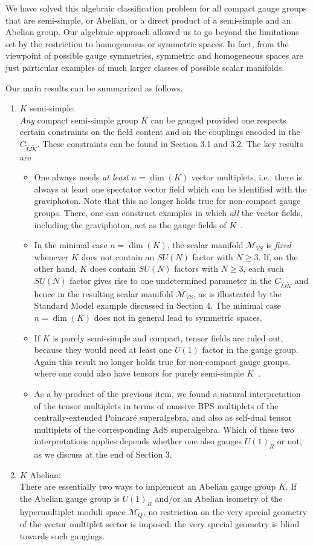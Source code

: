 \documentclass[a4paper,11pt]{article}
\newcommand{\ti}{\ensuremath{\tilde{I}}}
\newcommand{\tj}{\ensuremath{\tilde{J}}}
\newcommand{\tk}{\ensuremath{\tilde{K}}}
\newcommand{\M}{\ensuremath{\mathcal{M}}}
\begin{document}
We have solved this algebraic classification problem for all compact gauge
groups that are semi-simple, or Abelian, or a direct product of a
semi-simple and an Abelian group. Our algebraic approach allowed us to go
beyond the limitations set by the restriction to homogeneous or symmetric
spaces. In fact, from the viewpoint of possible gauge symmetries,
symmetric and homogeneous spaces are just particular examples of much
larger classes of possible scalar manifolds. 

Our main results can be summarized as follows.
\begin{enumerate}
\item $K$ semi-simple:\\
\emph{Any} compact semi-simple group $K$ can be gauged provided one 
respects certain constraints on the field content and on the 
couplings encoded in the $C_{\ti\tj\tk}$. These constraints can be
found in Section 3.1 and 3.2. The key results are
\begin{itemize}
\item One always needs \emph{at least} $n=\dim(K)$ vector multiplets,
i.e., there is always at least one spectator vector field which can be 
identified with the graviphoton. Note that this no longer holds true
for non-compact gauge groups. There, one can construct examples in which
\emph{all} the vector fields, including the graviphoton, act as the
gauge fields of $K$~\cite{GST2}. 
\item In the minimal case $n=\dim(K)$, the scalar manifold $\M_{VS}$ 
is \emph{fixed} whenever $K$ does not contain an $SU(N)$ factor with 
$N\geq 3$. If, on the other hand, 
$K$ does contain $SU(N)$ factors with $N \geq 3$, each such
$SU(N)$ factor gives rise to one  undetermined parameter
in the $C_{\ti\tj\tk}$ and hence in the resulting scalar manifold
$\M_{VS}$, as is illustrated by the Standard Model example discussed
in Section 4. The minimal case $n=\dim(K)$ 
does not in general lead to symmetric spaces.
\item If $K$ is purely semi-simple and compact, tensor fields are ruled out,
because they would need at least one $U(1)$ factor in the gauge group.
Again this result no longer holds true for non-compact gauge groups,
where one could also have tensors for purely semi-simple
$K$~\cite{GST2,GZ1}.
\item As a by-product of the previous item, we found a natural 
interpretation of the tensor multiplets in terms of massive BPS multiplets of the 
centrally-extended Poincar\'{e} superalgebra, and also as self-dual tensor multiplets of 
the corresponding AdS superalgebra. Which of these two interpretations applies depends 
whether one also gauges $U(1)_{R}$ or not, as we discuss at the end of Section 3.
\end{itemize}
\item $K$ Abelian:\\
There are essentially two ways to implement an Abelian gauge group $K$.
If the Abelian gauge group is $U(1)_R$ and/or an Abelian isometry
of the hypermultiplet moduli space $\M_{Q}$, no restriction on the
very special geometry of the vector multiplet sector is imposed:
the very special geometry is blind towards such gaugings.


\end{enumerate}
\end{document}
